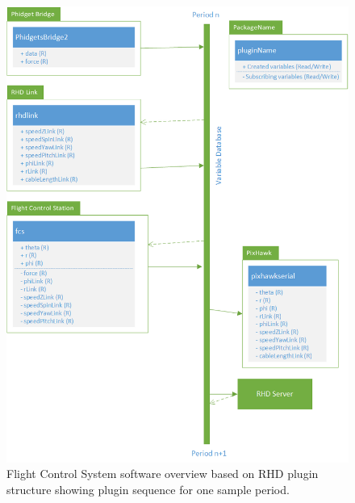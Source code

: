 \begin{figure}[hbtp]
\centering
\includegraphics[scale=0.8]{graphics/Visio/FCS-software-overview.png}
\caption[Flight Control System software overview]{Flight Control System software overview based on RHD plugin structure showing plugin sequence for one sample period.}
\end{figure}
